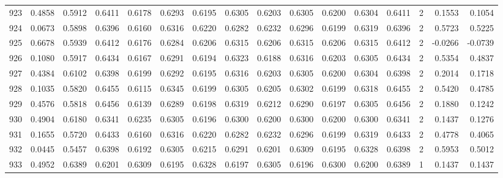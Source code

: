 \begin{tabular}{lrrrrrrrrrrrrrrr}
923 &      0.4858 &  0.5912 &  0.6411 &  0.6178 &  0.6293 &  0.6195 &  0.6305 &  0.6203 &  0.6305 &  0.6200 &   0.6304 &     0.6411 &      2 &                    0.1553 &                     0.1054 \\
924 &      0.0673 &  0.5898 &  0.6396 &  0.6160 &  0.6316 &  0.6220 &  0.6282 &  0.6232 &  0.6296 &  0.6199 &   0.6319 &     0.6396 &      2 &                    0.5723 &                     0.5225 \\
925 &      0.6678 &  0.5939 &  0.6412 &  0.6176 &  0.6284 &  0.6206 &  0.6315 &  0.6206 &  0.6315 &  0.6206 &   0.6315 &     0.6412 &      2 &                   -0.0266 &                    -0.0739 \\
926 &      0.1080 &  0.5917 &  0.6434 &  0.6167 &  0.6291 &  0.6194 &  0.6323 &  0.6188 &  0.6316 &  0.6203 &   0.6305 &     0.6434 &      2 &                    0.5354 &                     0.4837 \\
927 &      0.4384 &  0.6102 &  0.6398 &  0.6199 &  0.6292 &  0.6195 &  0.6316 &  0.6203 &  0.6305 &  0.6200 &   0.6304 &     0.6398 &      2 &                    0.2014 &                     0.1718 \\
928 &      0.1035 &  0.5820 &  0.6455 &  0.6115 &  0.6345 &  0.6199 &  0.6305 &  0.6205 &  0.6302 &  0.6199 &   0.6318 &     0.6455 &      2 &                    0.5420 &                     0.4785 \\
929 &      0.4576 &  0.5818 &  0.6456 &  0.6139 &  0.6289 &  0.6198 &  0.6319 &  0.6212 &  0.6290 &  0.6197 &   0.6305 &     0.6456 &      2 &                    0.1880 &                     0.1242 \\
930 &      0.4904 &  0.6180 &  0.6341 &  0.6235 &  0.6305 &  0.6196 &  0.6300 &  0.6200 &  0.6300 &  0.6200 &   0.6300 &     0.6341 &      2 &                    0.1437 &                     0.1276 \\
931 &      0.1655 &  0.5720 &  0.6433 &  0.6160 &  0.6316 &  0.6220 &  0.6282 &  0.6232 &  0.6296 &  0.6199 &   0.6319 &     0.6433 &      2 &                    0.4778 &                     0.4065 \\
932 &      0.0445 &  0.5457 &  0.6398 &  0.6192 &  0.6305 &  0.6215 &  0.6291 &  0.6201 &  0.6309 &  0.6195 &   0.6328 &     0.6398 &      2 &                    0.5953 &                     0.5012 \\
933 &      0.4952 &  0.6389 &  0.6201 &  0.6309 &  0.6195 &  0.6328 &  0.6197 &  0.6305 &  0.6196 &  0.6300 &   0.6200 &     0.6389 &      1 &                    0.1437 &                     0.1437 \\

\end{tabular}
